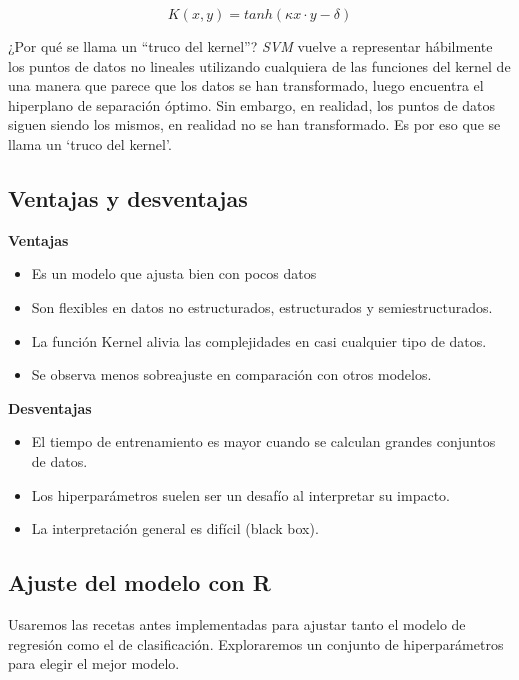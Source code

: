 \documentclass[
]{book}
\begin{document}
\[K(x, y)= tanh(\kappa x\cdot y-\delta)\]

¿Por qué se llama un ``truco del kernel''? \emph{SVM} vuelve a representar hábilmente los puntos de datos no lineales utilizando cualquiera de las funciones del kernel de una manera que parece que los datos se han transformado, luego encuentra el hiperplano de separación óptimo. Sin embargo, en realidad, los puntos de datos siguen siendo los mismos, en realidad no se han transformado. Es por eso que se llama un `truco del kernel'.

\hypertarget{ventajas-y-desventajas}{%
\subsection{Ventajas y desventajas}\label{ventajas-y-desventajas}}

\textbf{Ventajas}

\begin{itemize}
\item
  Es un modelo que ajusta bien con pocos datos
\item
  Son flexibles en datos no estructurados, estructurados y semiestructurados.
\item
  La función Kernel alivia las complejidades en casi cualquier tipo de datos.
\item
  Se observa menos sobreajuste en comparación con otros modelos.
\end{itemize}

\textbf{Desventajas}

\begin{itemize}
\item
  El tiempo de entrenamiento es mayor cuando se calculan grandes conjuntos de datos.
\item
  Los hiperparámetros suelen ser un desafío al interpretar su impacto.
\item
  La interpretación general es difícil (black box).
\end{itemize}

\hypertarget{ajuste-del-modelo-con-r}{%
\subsection{Ajuste del modelo con R}\label{ajuste-del-modelo-con-r}}

Usaremos las recetas antes implementadas para ajustar tanto el modelo de regresión como el de clasificación. Exploraremos un conjunto de hiperparámetros para elegir el mejor modelo.
\end{document}
